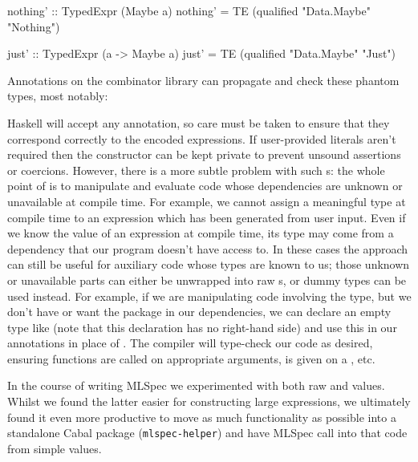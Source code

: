 \begin{haskell}
nothing' :: TypedExpr (Maybe a)
nothing' = TE (qualified "Data.Maybe" "Nothing")

just' :: TypedExpr (a -> Maybe a)
just' = TE (qualified "Data.Maybe" "Just")
\end{haskell}

Annotations on the combinator library can propagate and check these phantom
types, most notably:


Haskell will accept any annotation, so care must be taken to ensure that they
correspond correctly to the encoded expressions. If user-provided literals
aren't required then the  constructor can be kept private to prevent
unsound assertions or coercions. However, there is a more subtle problem with
such s: the whole point of \nixeval is to manipulate and evaluate
code whose dependencies are unknown or unavailable at compile time. For example,
we cannot assign a meaningful type at compile time to an expression which has
been generated from user input. Even if we know the value of an expression at
compile time, its type may come from a dependency that our program doesn't have
access to. In these cases the  approach can still be useful for
auxiliary code whose types are known to us; those unknown or unavailable parts
can either be unwrapped into raw s, or dummy types can be used instead.
For example, if we are manipulating code involving the  type,
but we don't have or want the  package in our dependencies, we can
declare an empty type like  (note that this declaration has no
right-hand side) and use this in our annotations in place of
. The compiler will type-check our code as desired, ensuring
functions are called on appropriate arguments,  is given on a
, etc.

In the course of writing MLSpec we experimented with both raw  and
 values. Whilst we found the latter easier for constructing large
expressions, we ultimately found it even more productive to move as much
functionality as possible into a standalone Cabal package
(\texttt{mlspec-helper}) and have MLSpec call into that code from simple
 values.
